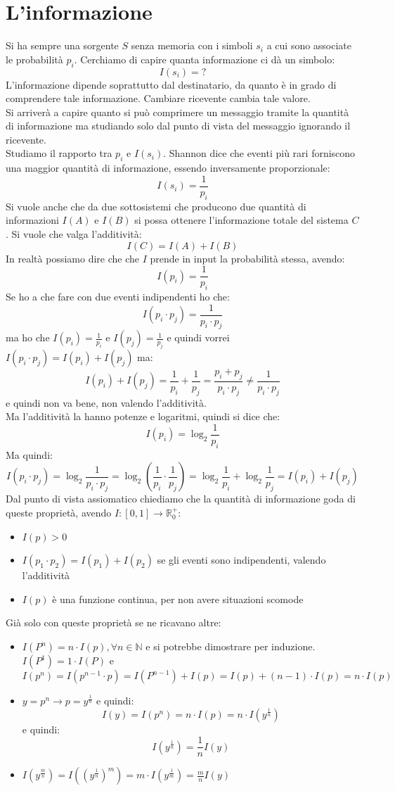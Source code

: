 \documentclass[a4paper,12pt, oneside]{book}
\begin{document}
\section{L'informazione}
Si ha sempre una sorgente $S$ senza memoria con i simboli $s_i$ a cui sono
associate le probabilità $p_i$. Cerchiamo di capire quanta informazione ci dà un
simbolo:
\[I(s_i)=?\]
L'informazione dipende soprattutto dal destinatario, da quanto è in grado di
comprendere tale informazione. Cambiare ricevente cambia tale valore.\\
Si arriverà a capire quanto si può comprimere un messaggio tramite la quantità
di informazione ma studiando solo dal punto di vista del messaggio ignorando il
ricevente.\\
Studiamo il rapporto tra $p_i$ e $I(s_i)$. Shannon dice che eventi più rari
forniscono una maggior quantità di informazione, essendo inversamente
proporzionale: 
\[I(s_i)=\frac{1}{p_i}\]
Si vuole anche che da due sottosistemi che producono due quantità di
informazioni $I(A)$ e $I(B)$ si possa ottenere l'informazione totale del
sistema $C$. Si vuole che valga l'additività:
\[I(C)=I(A)+I(B)\]
In realtà possiamo dire che che $I$ prende in input la probabilità stessa,
avendo:
\[I(p_i)=\frac{1}{p_i}\]
Se ho a che fare con due eventi indipendenti ho che:
\[I(p_i\cdot p_j)=\frac{1}{p_i\cdot p_j}\]
ma ho che $I(p_i)=\frac{1}{p_i}$ e $I(p_j)=\frac{1}{p_j}$ e quindi vorrei
$I(p_i\cdot p_j)=I(p_i)+I(p_j)$ ma:
\[I(p_i)+I(p_j)=\frac{1}{p_i}+\frac{1}{p_j}=\frac{p_i+p_j}{p_i\cdot p_j}\neq
  \frac{1}{p_i\cdot p_j}\]
e quindi non va bene, non valendo l'additività.\\
Ma l'additività la hanno potenze e logaritmi, quindi si dice che:
\[I(p_i)=\log_2\frac{1}{p_i}\]
Ma quindi:
\[I(p_i\cdot p_j)=\log_2\frac{1}{p_i\cdot
    p_j}=\log_2\left(\frac{1}{p_i}\cdot\frac{1}{p_j}\right)=
  \log_2\frac{1}{p_i}+\log_2\frac{1}{p_j}=I(p_i)+I(p_j)\]
Dal punto di vista assiomatico chiediamo che la quantità di informazione goda di
queste proprietà, avendo $I:[0,1]\to\mathbb{R}_0^+$:
\begin{itemize}
  \item $I(p)>0$
  \item $I(p_1\cdot p_2)=I(p_1)+I(p_2)$ se gli eventi sono indipendenti, valendo
  l'additività 
  \item $I(p)$ è una funzione continua, per non avere situazioni scomode
\end{itemize}
Già solo con queste proprietà se ne ricavano altre:
\begin{itemize}
  \item $I(P^n)=n\cdot I(p),\forall n\in \mathbb{N}$ e si potrebbe dimostrare
  per induzione. $I(P^1)=1\cdot I(P)$ e \[I(p^n)=I(p^{n-1}\cdot
    p)=I(P^{n-1})+I(p)=I(p)+(n-1)\cdot I(p)=n\cdot I(p)\]
  \item $y=p^n\to p=y^{\frac{1}{n}}$ e quindi:
  \[I(y)=I(p^n)=n\cdot I(p)=n\cdot I(y^{\frac{1}{n}})\]
  e quindi:
  \[I(y^{\frac{1}{n}})=\frac{1}{n}I(y)\]
  \item $I(y^\frac{m}{n})= I((y^{\frac{1}{n}})^m)=m\cdot
  I(y^{\frac{1}{m}})=\frac{m}{n}I(y)$ 
\end{itemize}
\end{document}
